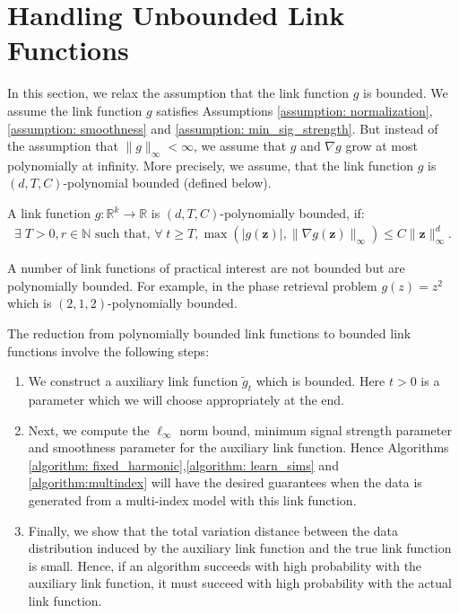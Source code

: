 \documentclass[final,12pt]{colt2018} %
\newcommand{\N}{\mathbb{N}}
\newcommand{\R}{\mathbb{R}}
\renewcommand\v[1]{{\ensuremath{\boldsymbol{#1}}}}
\begin{document}
\section{Handling Unbounded Link Functions}
\label{relax_boundedness}
In this section, we relax the assumption that the link function $g$ is bounded. We assume the link function $g$ satisfies Assumptions \ref{assumption: normalization}, \ref{assumption: smoothness} and \ref{assumption: min_sig_strength}. But instead of the assumption that $\|g\|_\infty < \infty$, we assume that $g$ and $\nabla g$ grow at most polynomially at infinity. More precisely, we assume, that the link function $g$ is $(d,T,C)$-polynomial bounded (defined below).
\begin{definition}
A link function $g: \R^k \rightarrow \R$ is $(d,T,C)$-polynomially bounded, if:
\begin{align*} \exists \; T > 0, r \in \N \text{ such that, } \forall \; t \geq T, \max(|g(\v z)|, \| \nabla g(\v z) \|_{\infty}) \leq C \| \v z\|_{\infty}^d. \end{align*}
\end{definition}
\begin{remark} A number of link functions of practical interest are not bounded but are polynomially bounded. For example, in the phase retrieval problem $g(z) = z^2$ which is $(2,1,2)$-polynomially bounded.
\end{remark}
The reduction from polynomially bounded link functions to bounded link functions involve the following steps:
\begin{enumerate}
    \item We construct a auxiliary link function $\tilde{g}_t$ which is bounded. Here $t>0$ is a parameter which we will choose appropriately at the end.
    \item Next, we compute the $\ell_\infty$ norm bound, minimum signal strength parameter and smoothness parameter for the auxiliary link function. Hence Algorithms \ref{algorithm: fixed_harmonic},\ref{algorithm: learn_sims} and \ref{algorithm:multindex} will have the desired guarantees when the data is generated from a multi-index model with this link function. 
    \item Finally, we show that the total variation distance between the data distribution induced by the auxiliary link function and the true link function is small. Hence, if an algorithm succeeds with high probability with the auxiliary link function, it must succeed with high probability with the actual link function.
\end{enumerate}
\end{document}
